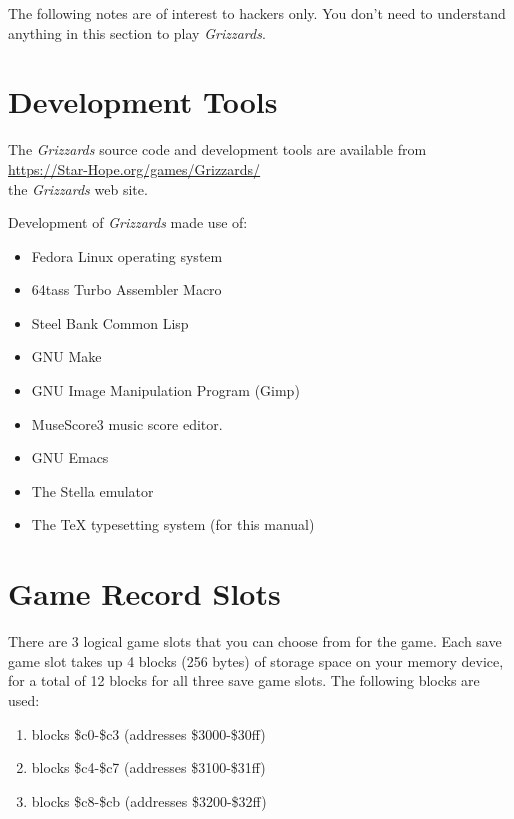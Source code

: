 \documentclass[12pt,openright,book]{memoir}
\begin{document}
\begin{description}
The following notes are of interest to hackers only. You don't need to
understand anything in this section to play \textit{Grizzards}.

\section{Development Tools}

The \textit{Grizzards}  source code and development  tools are available
from \\
\href{https://Star-Hope.org/games/Grizzards/}{https://Star-Hope.org/games/Grizzards/} \\
the \textit{Grizzards} web site.

Development of \textit{Grizzards} made use of:

\begin{itemize}
\item Fedora Linux\registered{} operating system
\item 64tass Turbo Assembler Macro
\item Steel Bank Common Lisp
\item GNU Make
\item GNU Image Manipulation Program (Gimp)
\item MuseScore3 music score editor.
\item GNU Emacs
\item The Stella emulator
\item The \TeX{} typesetting system (for this manual)
\end{itemize}

\section{Game Record Slots}

There are 3  logical game slots that  you can choose from  for the game.
Each save game  slot takes up 4  blocks (256 bytes) of  storage space on
your memory  device, for a  total of 12 blocks  for all three  save game
slots. The following blocks are used:

\ifdefined\DEMO

\begin{enumerate}
\item blocks \$c0-\$c3 (addresses \$3000-\$30ff)
\item blocks \$c4-\$c7 (addresses \$3100-\$31ff)
\item blocks \$c8-\$cb (addresses \$3200-\$32ff)
\end{enumerate}


\end{description}
\end{document}
